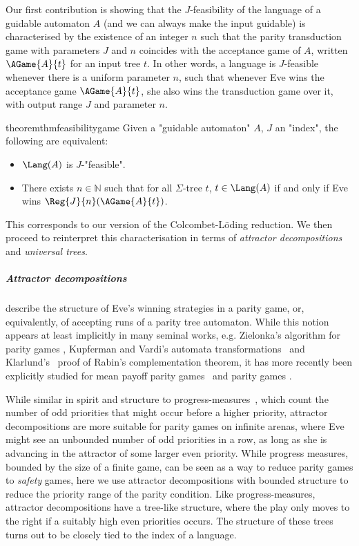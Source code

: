 \documentclass[a4paper,UKenglish,cleveref, autoref, thm-restate]{lipics-v2021}
\newcommand{\NN}{\mathbb{N}}
\newcommand{\A}{{A}}
\begin{document}
Our first contribution is showing that the $J$-feasibility of the language of a guidable automaton $\A$ (and we can always make the input guidable) is characterised by the existence of an integer $n$ such that the parity transduction game with parameters $J$ and $n$ coincides with the acceptance game of $\A$, written $\AGame{\A}{t}$ for an input tree $t$. In other words, a language is $J$-feasible whenever there is a uniform parameter $n$, such that whenever Eve wins the acceptance game $\AGame{\A}{t}$, she also wins the transduction game over it, with output range $J$ and parameter $n$.

\begin{restatable}{theorem}{thmfeasibilitygame}\label{thm:feasible-register}
Given a "guidable automaton" $\A$, $J$ an "index", the following are equivalent:
\begin{itemize}
\item $\Lang(\A)$ is $J$-"feasible".
\item There exists $n\in \NN$ such that for all $\Sigma$-tree $t$, $t\in \Lang(A)$ if and only if Eve wins $\Reg{J}{n}(\AGame{\A}{t})$.
\end{itemize}

\end{restatable}
 
 This corresponds to our version of the Colcombet-L\"oding reduction.
 We then proceed to reinterpret this characterisation in terms of \textit{attractor decompositions} and \textit{universal trees}.\\

\subparagraph*{Attractor decompositions}
describe the structure of Eve's winning strategies in a parity game, or, equivalently, of accepting runs of a parity tree automaton.
While this notion appears at least implicitly in many seminal works, e.g. Zielonka's algorithm for parity games \cite{Zielonka1998InfiniteGO}, Kupferman and Vardi's automata transformations~\cite{KV98} and Klarlund's~\cite{Klarlund1991ProgressMF} proof of Rabin's complementation theorem, 
it has more recently been explicitly studied  for mean payoff parity games~\cite{Daviaud_2018} and  parity games \cite{Attractor_decomposition_next,jurdzinski2022universalalgorithmsparitygames}.

While similar in spirit and structure to progress-measures~\cite{Jurdzinski2017SuccinctPM}, which count the number of odd priorities that might occur before a higher priority, attractor decompositions are more suitable for parity games on infinite arenas, where Eve might see an unbounded number of odd priorities in a row, as long as she is advancing in the attractor of some larger even priority. While progress measures, bounded by the size of a finite game, can be seen as a way to reduce parity games to \textit{safety} games, here we use attractor decompositions with bounded structure to reduce the priority range of the parity condition.
Like progress-measures, attractor decompositions have a tree-like structure, where the play only moves to the right if a suitably high even priorities occurs. The structure of these trees turns out to be closely tied to the index of a language.\\
\end{document}
